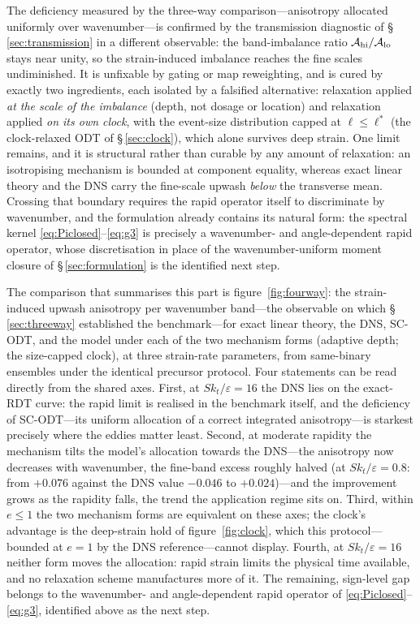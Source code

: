 \documentclass[lineno]{JFM-FLM_Au}
\begin{document}
The deficiency measured by the three-way comparison---anisotropy
allocated uniformly over wavenumber---is confirmed by the transmission
diagnostic of \S\,\ref{sec:transmission} in a different observable: the
band-imbalance ratio $\mathcal A_{\rm hi}/\mathcal A_{\rm lo}$ stays
near unity, so the strain-induced imbalance reaches the fine scales
undiminished. It is unfixable by gating or map reweighting, and is
cured by exactly two ingredients, each isolated by a falsified
alternative: relaxation applied \emph{at the scale of the imbalance}
(depth, not dosage or location) and relaxation applied \emph{on its
own clock}, with the event-size distribution capped at
$\ell\le\ell^{*}$ (the clock-relaxed ODT of \S\,\ref{sec:clock}),
which alone survives deep strain. One limit remains, and it is
structural rather than curable by any amount of relaxation: an
isotropising mechanism is bounded at component equality, whereas exact
linear theory and the DNS carry the fine-scale upwash \emph{below} the
transverse mean. Crossing that boundary requires the rapid operator
itself to discriminate by wavenumber, and the formulation already
contains its natural form: the spectral kernel
\eqref{eq:Piclosed}--\eqref{eq:g3} is precisely a wavenumber- and
angle-dependent rapid operator, whose discretisation in place of the
wavenumber-uniform moment closure of \S\,\ref{sec:formulation} is the
identified next step.

The comparison that summarises this part is
figure~\ref{fig:fourway}: the strain-induced upwash anisotropy per
wavenumber band---the observable on which \S\,\ref{sec:threeway}
established the benchmark---for exact linear theory, the DNS, SC-ODT,
and the model under each of the two mechanism
forms (adaptive depth; the size-capped clock), at three strain-rate
parameters, from same-binary ensembles under the identical precursor
protocol. Four statements can be read directly from the shared axes.
First, at $Sk_t/\varepsilon=16$ the DNS lies on the exact-RDT curve:
the rapid limit is realised in the benchmark itself, and the
deficiency of SC-ODT---its uniform allocation of a correct
integrated anisotropy---is starkest precisely where the eddies matter
least. Second, at moderate rapidity the mechanism tilts the model's
allocation towards the DNS---the anisotropy now decreases with
wavenumber, the fine-band excess roughly halved (at
$Sk_t/\varepsilon=0.8$: from $+0.076$ against the DNS value $-0.046$
to $+0.024$)---and the improvement grows as the rapidity falls, the
trend the application regime sits on. Third, within $e\le1$ the two
mechanism forms are equivalent on these axes; the clock's advantage is
the deep-strain hold of figure~\ref{fig:clock}, which this
protocol---bounded at $e=1$ by the DNS reference---cannot display.
Fourth, at $Sk_t/\varepsilon=16$ neither form moves the allocation:
rapid strain limits the physical time available, and no relaxation
scheme manufactures more of it. The remaining, sign-level gap belongs to the
wavenumber- and angle-dependent rapid operator of
\eqref{eq:Piclosed}--\eqref{eq:g3}, identified above as the next step.
\end{document}
